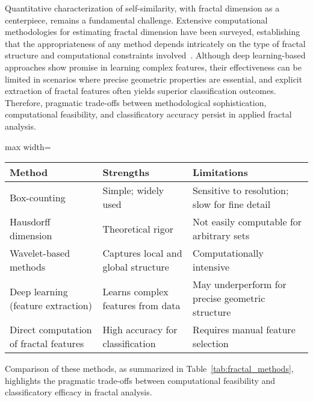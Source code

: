 \documentclass[sigconf]{acmart}
\begin{document}
Quantitative characterization of self-similarity, with fractal dimension as a centerpiece, remains a fundamental challenge. Extensive computational methodologies for estimating fractal dimension have been surveyed, establishing that the appropriateness of any method depends intricately on the type of fractal structure and computational constraints involved~\cite{ref30}. Although deep learning-based approaches show promise in learning complex features, their effectiveness can be limited in scenarios where precise geometric properties are essential, and explicit extraction of fractal features often yields superior classification outcomes. Therefore, pragmatic trade-offs between methodological sophistication, computational feasibility, and classificatory accuracy persist in applied fractal analysis.

\begin{table*}[htbp]
\centering
\caption{Selected Approaches to Fractal Dimension Estimation and Their Applicability}
\label{tab:fractal_methods}
\begin{adjustbox}{max width=\textwidth}
\begin{tabular}{lll}
\toprule
\textbf{Method}                 & \textbf{Strengths}                          & \textbf{Limitations}                    \\
\midrule
Box-counting                    & Simple; widely used                         & Sensitive to resolution; slow for fine detail \\
Hausdorff dimension             & Theoretical rigor                           & Not easily computable for arbitrary sets      \\
Wavelet-based methods           & Captures local and global structure         & Computationally intensive                      \\
Deep learning (feature extraction) & Learns complex features from data         & May underperform for precise geometric structure \\
Direct computation of fractal features & High accuracy for classification     & Requires manual feature selection                \\
\bottomrule
\end{tabular}
\end{adjustbox}
\end{table*}

Comparison of these methods, as summarized in Table~\ref{tab:fractal_methods}, highlights the pragmatic trade-offs between computational feasibility and classificatory efficacy in fractal analysis.
\end{document}
